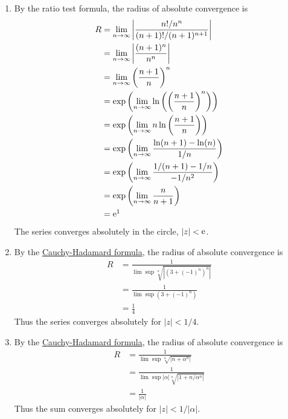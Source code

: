 {\begin{Solution}
\begin{enumerate}
    The series converges only for $z = 0$.
  \item
    By the ratio test formula, the radius of absolute convergence is
    \begin{align*}
      R
      &= \lim_{n \to \infty} \left| \frac{n! / n^n}{(n + 1)! / (n+1)^{n+1} } \right| 
      \\
      &= \lim_{n \to \infty} \left| \frac{(n + 1)^n}{n^n} \right| 
      \\
      &= \lim_{n \to \infty} \left( \frac{n + 1}{n} \right)^n 
      \\
      &= \exp \left( \lim_{n \to \infty} \ln \left( 
          \left( \frac{n + 1}{n} \right)^n \right) \right) 
      \\
      &= \exp \left( \lim_{n \to \infty} n \ln 
        \left( \frac{n + 1}{n} \right) \right) 
      \\
      &= \exp \left( \lim_{n \to \infty} \frac{ \ln(n + 1) - \ln(n) }{ 1/n } \right) 
      \\
      &= \exp \left( \lim_{n \to \infty} \frac{ 1/(n + 1) - 1/n }{ -1/n^2 } \right) 
      \\
      &= \exp \left( \lim_{n \to \infty} \frac{ n }{ n + 1 } \right) 
      \\
      &= \mathop{\mathrm{e}}\nolimits^1
    \end{align*}
    The series converges absolutely in the circle, $|z| < \mathop{\mathrm{e}}\nolimits$.
  \item
    By the 
    \hyperref[result cauchy hadamard formula]{Cauchy-Hadamard formula},
    the radius of absolute convergence is
    \begin{align*}
      R
      &= \frac{1}{\lim \sup \sqrt[n]{| \left( 3 + (-1)^n \right)^n | } } 
      \\
      &= \frac{1}{\lim \sup \left( 3 + (-1)^n \right) } 
      \\
      &= \frac{1}{4}
    \end{align*}
    Thus the series converges absolutely for $|z| < 1/4$.
  \item
    By the 
    \hyperref[result cauchy hadamard formula]{Cauchy-Hadamard formula},
    the radius of absolute convergence is
    \begin{align*}
      R
      &= \frac{1}{\lim \sup \sqrt[n]{| n + \alpha^n | } } 
      \\
      &= \frac{1}{\lim \sup | \alpha | \sqrt[n]{| 1 + n /  \alpha^n | } } 
      \\
      &= \frac{1}{ |\alpha| }
    \end{align*}
    Thus the sum converges absolutely for $|z| < 1/|\alpha|$.
  \end{enumerate}
\end{Solution}


}
